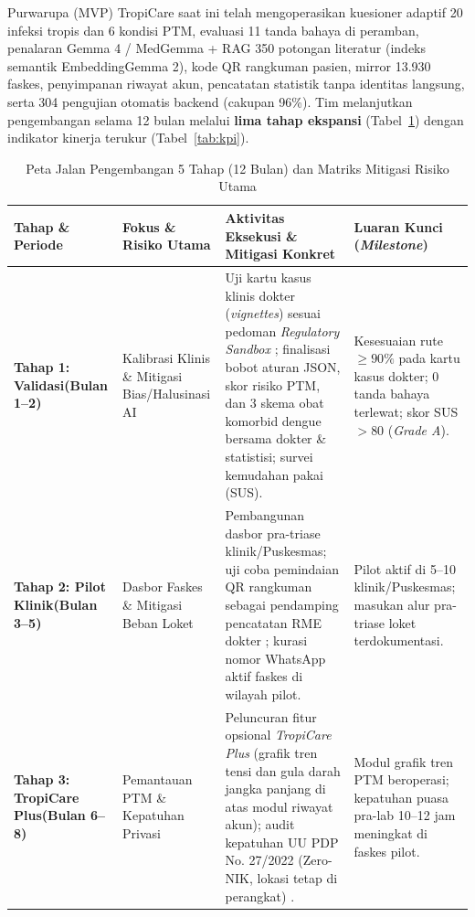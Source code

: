 Purwarupa (MVP) TropiCare saat ini telah mengoperasikan kuesioner adaptif 20 infeksi tropis dan 6 kondisi PTM, evaluasi 11 tanda bahaya di peramban, penalaran Gemma 4 / MedGemma + RAG 350 potongan literatur (indeks semantik EmbeddingGemma 2), kode QR rangkuman pasien, mirror 13.930 faskes, penyimpanan riwayat akun, pencatatan statistik tanpa identitas langsung, serta 304 pengujian otomatis backend (cakupan 96\%). Tim melanjutkan pengembangan selama 12 bulan melalui \textbf{lima tahap ekspansi} (Tabel~\ref{tab:roadmap}) dengan indikator kinerja terukur (Tabel~\ref{tab:kpi}).

\begin{table}[H]
\centering
\footnotesize
\caption{Peta Jalan Pengembangan 5 Tahap (12 Bulan) dan Matriks Mitigasi Risiko Utama}\label{tab:roadmap}
\vspace{3pt}
\begin{tabularx}{\textwidth}{p{2.4cm} p{2.9cm} X p{3.7cm}}
\toprule
\textbf{Tahap \& Periode} & \textbf{Fokus \& Risiko Utama} & \textbf{Aktivitas Eksekusi \& Mitigasi Konkret} & \textbf{Luaran Kunci (\textit{Milestone})} \\
\midrule
\textbf{Tahap 1: Validasi\newline(Bulan 1--2)} & Kalibrasi Klinis \& Mitigasi Bias/Halusinasi AI & Uji kartu kasus klinis dokter (\textit{vignettes}) sesuai pedoman \textit{Regulatory Sandbox} \citep{UUKesehatan2023,KemenkesDTO2024}; finalisasi bobot aturan JSON, skor risiko PTM, dan 3 skema obat komorbid dengue bersama dokter \& statistisi; survei kemudahan pakai (SUS). & Kesesuaian rute $\ge 90\%$ pada kartu kasus dokter; 0 tanda bahaya terlewat; skor SUS $>80$ (\textit{Grade A}). \\
\midrule
\textbf{Tahap 2: Pilot Klinik\newline(Bulan 3--5)} & Dasbor Faskes \& Mitigasi Beban Loket & Pembangunan dasbor pra-triase klinik/Puskesmas; uji coba pemindaian QR rangkuman sebagai pendamping pencatatan RME dokter \citep{Permenkes2022}; kurasi nomor WhatsApp aktif faskes di wilayah pilot. & Pilot aktif di 5--10 klinik/Puskesmas; masukan alur pra-triase loket terdokumentasi. \\
\midrule
\textbf{Tahap 3: TropiCare Plus\newline(Bulan 6--8)} & Pemantauan PTM \& Kepatuhan Privasi & Peluncuran fitur opsional \textit{TropiCare Plus} (grafik tren tensi dan gula darah jangka panjang di atas modul riwayat akun); audit kepatuhan UU PDP No. 27/2022 (Zero-NIK, lokasi tetap di perangkat) \citep{UUPDP2022}. & Modul grafik tren PTM beroperasi; kepatuhan puasa pra-lab 10--12 jam meningkat di faskes pilot. \\

\end{tabularx}
\end{table}
